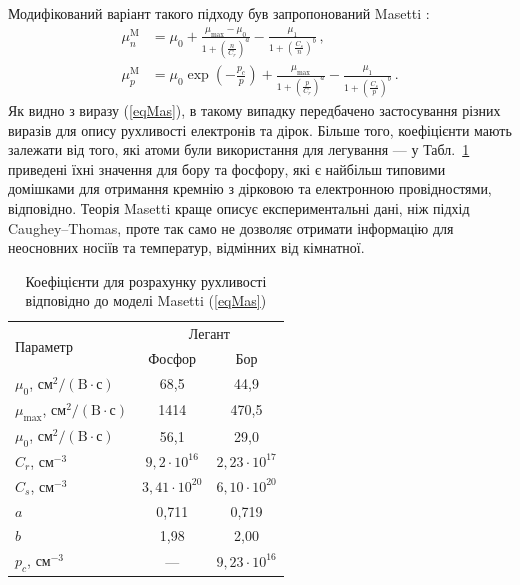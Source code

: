\documentclass[14pt,a4paper,titlepage,oneside]{book}
\numberwithin{equation}{part}
\begin{document}
Модифікований варіант такого підходу був запропонований Masetti \cite{Masetti1983}:
\begin{equation}\label{eqMas}
\begin{aligned}
    \mu_n^\mathrm{M} &=\mu_0+\frac{\mu_\mathrm{max}-\mu_0}{1+\left(\frac{n}{C_r}\right)^a}-\frac{\mu_1}{1+\left(\frac{C_s}{n}\right)^b}\,, \\
   \mu_p^\mathrm{M} &=\mu_0\exp\left(-\frac{p_c}{p}\right)+\frac{\mu_\mathrm{max}}{1+\left(\frac{p}{C_r}\right)^a}-\frac{\mu_1}{1+\left(\frac{C_s}{p}\right)^b}\,.
\end{aligned}
\end{equation}
Як видно з виразу (\ref{eqMas}), в такому випадку передбачено застосування різних виразів для опису рухливості електронів та дірок.
Більше того, коефіцієнти мають залежати від того, які атоми були використання для легування --- у Табл.~\ref{tblMas} приведені
їхні значення для бору та фосфору, які є найбільш типовими домішками для отримання кремнію з дірковою та електронною провідностями, відповідно.
Теорія Masetti краще описує експериментальні дані, ніж підхід  Caughey--Thomas, проте так само не дозволяє отримати інформацію для неосновних носіїв та
температур, відмінних від кімнатної.

\begin{table}
\caption{Коефіцієнти для розрахунку рухливості відповідно до моделі Masetti (\ref{eqMas})}
\label{tblMas}
\centering
\begin{tabular}{|l|c|c|}
\hline
\multirow{2}{*}{Параметр} & \multicolumn{2}{c|}{Легант} \\
\cline{2-3}
&Фосфор&Бор\\
\hline
$\mu_0$, $\text{см}^2/(\text{B}\cdot\text{с})$&68,5&44,9\\
\hline
$\mu_\mathrm{max}$, $\text{см}^2/(\text{B}\cdot\text{с})$&1414&470,5\\
\hline
$\mu_0$, $\text{см}^2/(\text{B}\cdot\text{с})$&56,1&29,0\\
\hline
$C_r$, см$^{-3}$&$9,2\cdot10^{16}$&$2,23\cdot10^{17}$\\
\hline
$C_s$, см$^{-3}$&$3,41\cdot10^{20}$&$6,10\cdot10^{20}$\\
\hline
$a$&0,711&0,719\\
\hline
$b$&1,98&2,00\\
\hline
$p_c$, см$^{-3}$&---&$9,23\cdot10^{16}$\\
\hline
\end{tabular}
\end{table}
\end{document}
